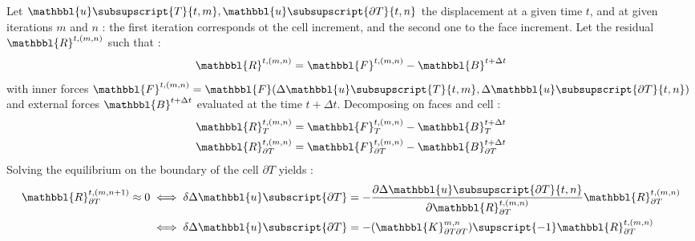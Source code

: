         Let $\mathbbl{u}\subsupscript{{T}}{t,m}, \mathbbl{u}\subsupscript{{\partial T}}{t,n}$ the displacement at a given time $t$, and at given iterations $m$ and $n$ : the first iteration corresponds ot the cell increment, and the second one to the face increment.  
        Let the residual $\mathbbl{R}^{t,(m,n)}$ such that :
        \begin{equation}
            \mathbbl{R}^{t,(m,n)}
            =
            \mathbbl{F}^{t, (m,n)}
            -
            \mathbbl{B}^{t+\Delta t}
        \end{equation}
        with inner forces $\mathbbl{F}^{t,(m,n)} = \mathbbl{F}(\Delta\mathbbl{u}\subsupscript{{T}}{t,m}, \Delta\mathbbl{u}\subsupscript{{\partial T}}{t,n})$ and external forces $\mathbbl{B}^{t+\Delta t}$ evaluated at the time $t+\Delta t$.
        Decomposing on faces and cell :
        \begin{equation}
            \begin{aligned}
                & \mathbbl{R}_{T}^{t,(m,n)}
                =
                \mathbbl{F}_{T}^{t,(m,n)}
                -
                \mathbbl{B}_{T}^{t+\Delta t}
                \\
                & \mathbbl{R}_{\partial T}^{t,(m,n)}
                =
                \mathbbl{F}_{\partial T}^{t,(m,n)}
                -
                \mathbbl{B}_{\partial T}^{t+\Delta t}
            \end{aligned}
        \end{equation}
        Solving the equilibrium on the boundary of the cell $\partial T$ yields :
        \begin{equation}
            \begin{aligned}
                \mathbbl{R}_{\partial T}^{t,(m,n+1)}
                \approx
                0
                & \iff
                \delta\Delta\mathbbl{u}\subscript{{\partial T}}
                =
                -
                \frac{\partial \Delta\mathbbl{u}\subsupscript{{\partial T}}{t,n}}{\partial \mathbbl{R}_{\partial T}^{t,(m,n)}}
                \mathbbl{R}_{\partial T}^{t,(m,n)}
                \\
                & \iff
                \delta\Delta\mathbbl{u}\subscript{{\partial T}}
                =
                -
                (\mathbbl{K}_{\partial T \partial T}^{m,n})\supscript{-1}
                \mathbbl{R}_{\partial T}^{t,(m,n)}
            \end{aligned}
        \end{equation}
